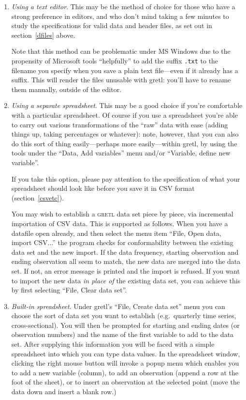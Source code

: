 \documentclass{article}
\begin{document}
\begin{enumerate}
\item \textit{Using a text editor}.  This may be the method of choice
  for those who have a strong preference in editors, and who don't
  mind taking a few minutes to study the specifications for valid data
  and header files, as set out in section~\ref{dfiles} above.

  Note that this method can be problematic under MS Windows due to
  the propensity of Microsoft tools ``helpfully'' to add the suffix
  \texttt{.txt} to the filename you specify when you save a plain text
  file---even if it already has a suffix.  This will render the files
  unusable with \textsf{gretl}: you'll have to rename them
  manually, outside of the editor.
  
\item \textit{Using a separate spreadsheet}.  This may be a good
  choice if you're comfortable with a particular spreadsheet.  Of
  course if you use a spreadsheet you're able to carry out various
  transformations of the ``raw'' data with ease (adding things up,
  taking percentages or whatever): note, however, that you can also do
  this sort of thing easily---perhaps more easily---within
  \textsf{gretl}, by using the tools under the ``Data, Add variables''
  menu and/or ``Variable, define new variable''.

  If you take this option, please pay attention to the specification
  of what your spreadsheet should look like before you save it in CSV
  format (section~\ref{csvetc}).
  
  You may wish to establish a \textsc{gretl} data set piece by piece,
  via incremental importation of CSV data.  This is supported as
  follows.  When you have a datafile open already, and then select the
  menu item ``File, Open data, import CSV...'' the program checks for
  conformability between the existing data set and the new import.  If
  the data frequency, starting observation and ending observation all
  seem to match, the new data are merged into the data set.  If not,
  an error message is printed and the import is refused.  If you want
  to import the new data \textit{in place of} the existing data set,
  you can achieve this by first selecting ``File, Clear data set''.
  
\item \textit{Built-in spreadsheet}.  Under \textsf{gretl}'s ``File,
  Create data set'' menu you can choose the sort of data set you want
  to establish (e.g.\ quarterly time series, cross-sectional).  You
  will then be prompted for starting and ending dates (or observation
  numbers) and the name of the first variable to add to the data set.
  After supplying this information you will be faced with a simple
  spreadsheet into which you can type data values.  In the spreadsheet
  window, clicking the right mouse button will invoke a popup menu
  which enables you to add a new variable (column), to add an
  observation (append a row at the foot of the sheet), or to insert an
  observation at the selected point (move the data down and insert a
  blank row.)
  

\end{enumerate}
\end{document}
